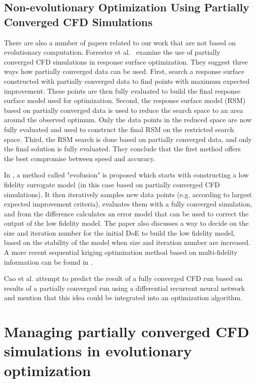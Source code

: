 \subsection{Non-evolutionary Optimization Using Partially Converged CFD Simulations \label{sec:nonEA}}
There are also a number of papers related to our work that are not based on evolutionary computation.
Forrester et al.~\cite{FBK03} examine the use of partially converged CFD simulations in response surface optimization. They suggest three ways how partially converged data can be used. First, search a response surface constructed with partially converged data to find points with maximum expected improvement. These points are then fully evaluated to build the final response surface model used for optimization. Second, the response surface model (RSM) based on partially converged data is used to reduce the search space to an area around the observed optimum. Only the data points in the reduced space are now fully evaluated and used to construct the final RSM on the restricted search space.
Third, the RSM search is done based on partially converged data, and only the final solution is fully evaluated. They conclude that the first method offers the best compromise between speed and accuracy. 

In \cite{FBK06}, a method called "evofusion" is proposed which starts with constructing a low fidelity surrogate model (in this case based on partially converged CFD simulations). It then iteratively samples new data points (e.g. according to largest expected improvement criteria), evaluates them with a fully converged simulation, and from the difference calculates an error model that can be used to correct the output of the low fidelity model. The paper also discusses a way to decide on the size and iteration number for the initial DoE to build the low fidelity model, based on the stability of the model when size and iteration number are increased. A more recent sequential kriging optimization method based on multi-fidelity information can be found in \cite{GrCa15}.

Cao et al.\cite{CJKS08} attempt to predict the result of a fully converged CFD run based on results of a partially converged run using a differential recurrent neural network and mention that this idea could be integrated into an optimization algorithm.




\section{Managing partially converged CFD simulations in evolutionary optimization\label{sec:MFEA}}

